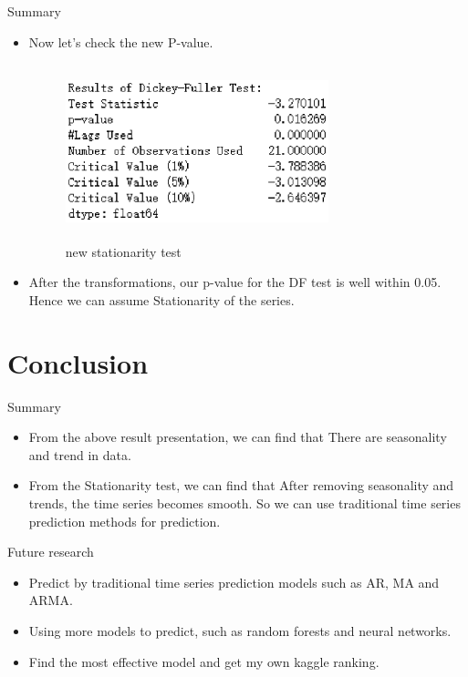 \documentclass[
 size=12pt,
 paper=smartboard, %
 mode=present, %
 display=slides, %
 style=tuliplab,  %
 pauseslide,
 fleqn,leqno,clock]{powerdot}
\begin{document}
\begin{slide}{Summary}
  \begin{itemize}
    \item
          Now let's check the new P-value.
          \begin{figure}
            \centering
            \includegraphics[width=3in,height=2in]{Figures/12.eps}
            \caption{new stationarity test}
            \label{new stationarity test}
          \end{figure}
    \item
          After the transformations, our p-value for the DF test is well within 0.05.
          Hence we can assume Stationarity of the series.
  \end{itemize}
\end{slide}

\section{Conclusion}
\begin{slide}{Summary}
  \begin{itemize}
    \item From the above result presentation, we can find that
          \subitem There are seasonality and trend in data.
          \bigskip
    \item From the Stationarity test, we can find that
          \subitem After removing seasonality and trends, the time series becomes smooth.
          \smallskip
          \subitem So we can use traditional time series prediction methods for prediction.
  \end{itemize}
\end{slide}

\begin{slide}{Future research}
  \begin{itemize}
    \item Predict by traditional time series prediction models such as AR, MA and ARMA.
    \item Using more models to predict, such as random forests and neural networks.
    \item Find the most effective model and get my own kaggle ranking.
  \end{itemize}
\end{slide}
\end{document}
